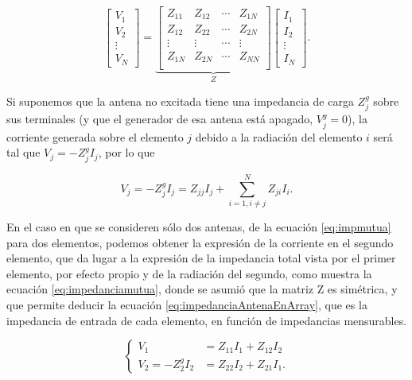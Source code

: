 \begin{equation} \label{eq:Matriz_impedancias_mutuas}
\begin{bmatrix}
V_1 \\ V_2 \\ \vdots \\ V_N
\end{bmatrix}
=
\underbrace{\begin{bmatrix}
	Z_{11} & Z_{12} & \cdots & Z_{1N} \\
	Z_{12} & Z_{22} & \cdots & Z_{2N} \\
	\vdots & \vdots & \cdots & \vdots \\
	Z_{1N} & Z_{2N} & \cdots & Z_{NN} \\
	\end{bmatrix}}_{Z}
\begin{bmatrix}
I_1 \\ I_2 \\ \vdots \\ I_N
\end{bmatrix}.
\end{equation}

Si suponemos que la antena no excitada tiene una impedancia de carga $Z^g_j$ sobre sus terminales (y que el generador de esa antena está apagado, $V^g_j=0$), la corriente generada sobre el elemento $j$ debido a la radiación del elemento $i$ será tal que $V_j=-Z^g_j I_j$, por lo que

\begin{equation} \label{eq:impmutua}
V_j = -Z^g_j I_j = Z_{jj}I_j + \sum_{i=1, i \neq j}^{N} Z_{ji}I_i.
\end{equation}

En el caso en que se consideren sólo dos antenas, de la ecuación \ref{eq:impmutua} para dos elementos, podemos obtener la expresión de la corriente en el segundo elemento, que da lugar a la expresión de la impedancia total vista por el primer elemento, por efecto propio y de la radiación del segundo, como muestra la ecuación \ref{eq:impedanciamutua}, donde se asumió que la matriz Z es simétrica, y que permite deducir la ecuación \ref{eq:impedanciaAntenaEnArray}, que es la impedancia de entrada de cada elemento, en función de impedancias mensurables.

\begin{equation}
	\label{eq:impedanciamutua}
	\left\{
	\begin{aligned}
		V_1 &= Z_{11} I_1 + Z_{12} I_2 \\
		V_2 = -Z^g_2 I_2 &= Z_{22} I_2 + Z_{21}I_1.
	\end{aligned}
	\right.
\end{equation}


